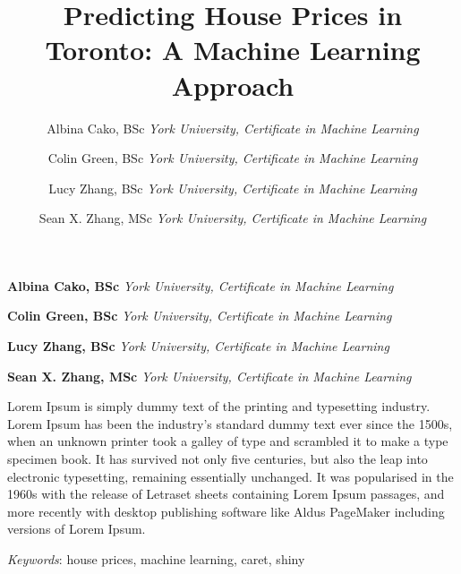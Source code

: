 \documentclass[11pt,]{article}
\title{Predicting House Prices in Toronto: A Machine Learning Approach  }
\author{\Large Albina Cako, BSc\vspace{0.05in} \newline\normalsize\emph{York University, Certificate in Machine Learning}   \and \Large Colin Green, BSc\vspace{0.05in} \newline\normalsize\emph{York University, Certificate in Machine Learning}   \and \Large Lucy Zhang, BSc\vspace{0.05in} \newline\normalsize\emph{York University, Certificate in Machine Learning}   \and \Large Sean X. Zhang, MSc\vspace{0.05in} \newline\normalsize\emph{York University, Certificate in Machine Learning}  }
\date{}
\newcommand*{\authorfont}{\fontfamily{phv}\selectfont}
\renewenvironment{abstract}
 {{%
    \setlength{\leftmargin}{0mm}
    \setlength{\rightmargin}{\leftmargin}%
  }%
  \relax}
 {\endlist}
\begin{document}
	
%

{%
\setlength{\parindent}{0pt}
\thispagestyle{plain}
{\fontsize{18}{20}\selectfont\raggedright 
\maketitle  %

}

{
   \vskip 13.5pt\relax \normalsize\fontsize{11}{12} 
\textbf{\authorfont Albina Cako, BSc} \hskip 15pt \emph{\small York University, Certificate in Machine Learning}   \par \textbf{\authorfont Colin Green, BSc} \hskip 15pt \emph{\small York University, Certificate in Machine Learning}   \par \textbf{\authorfont Lucy Zhang, BSc} \hskip 15pt \emph{\small York University, Certificate in Machine Learning}   \par \textbf{\authorfont Sean X. Zhang, MSc} \hskip 15pt \emph{\small York University, Certificate in Machine Learning}   

}

}








\begin{abstract}

    \hbox{\vrule height .2pt width 39.14pc}

    \vskip 8.5pt %

\noindent Lorem Ipsum is simply dummy text of the printing and typesetting
industry. Lorem Ipsum has been the industry's standard dummy text ever
since the 1500s, when an unknown printer took a galley of type and
scrambled it to make a type specimen book. It has survived not only five
centuries, but also the leap into electronic typesetting, remaining
essentially unchanged. It was popularised in the 1960s with the release
of Letraset sheets containing Lorem Ipsum passages, and more recently
with desktop publishing software like Aldus PageMaker including versions
of Lorem Ipsum.


\vskip 8.5pt \noindent \emph{Keywords}: house prices, machine learning, caret, shiny \par

    \hbox{\vrule height .2pt width 39.14pc}



\end{abstract}
\end{document}
